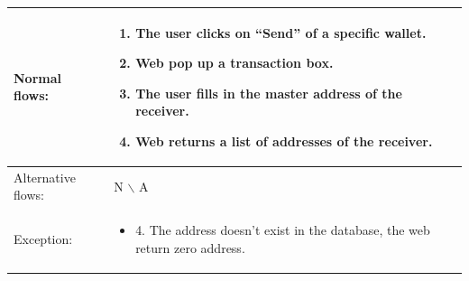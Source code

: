 \begin{table}[]
\begin{tabular}{m{4cm}  m{11cm}}
        Normal flows:      & \begin{enumerate}
            \item The user clicks on “Send” of a specific wallet.
            \item Web pop up a transaction box.
            \item The user fills in the master address of the receiver.
            \item Web returns a list of addresses of the receiver.
        \end{enumerate}                                                                                                              \\ 
        \midrule 
        Alternative flows: & N $\backslash$ A                                                                                                                        \\ 
        \midrule 
        Exception:         & \begin{itemize}
            \item {4. The address doesn't exist in the database, the web return zero address.}
        \end{itemize}           \\ 
        \bottomrule
    \end{tabular}
\end{table}
\clearpage


